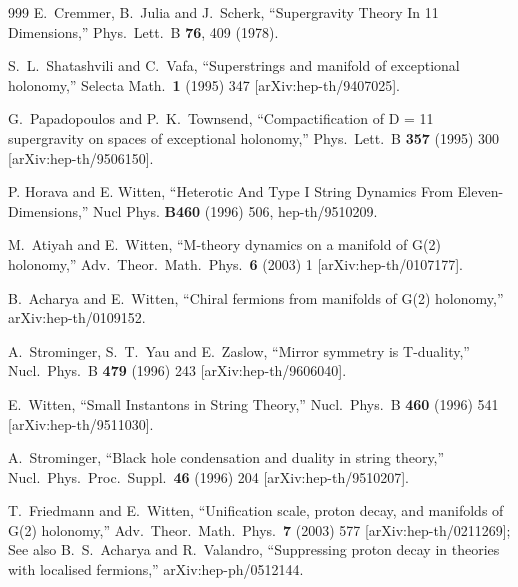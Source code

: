 \begin{thebibliography}{999}
  E.~Cremmer, B.~Julia and J.~Scherk,
  ``Supergravity Theory In 11 Dimensions,''
  Phys.\ Lett.\ B {\bf 76}, 409 (1978).

  S.~L.~Shatashvili and C.~Vafa,
  ``Superstrings and manifold of exceptional holonomy,''
  Selecta Math.\  {\bf 1} (1995) 347
  [arXiv:hep-th/9407025].

  G.~Papadopoulos and P.~K.~Townsend,
  ``Compactification of D = 11 supergravity on spaces of exceptional
  holonomy,''
  Phys.\ Lett.\ B {\bf 357} (1995) 300
  [arXiv:hep-th/9506150].

P. Horava and E. Witten, ``Heterotic And Type I String Dynamics From
Eleven-Dimensions,'' Nucl Phys. {\bf B460} (1996) 506,
hep-th/9510209.

  M.~Atiyah and E.~Witten,
  ``M-theory dynamics on a manifold of G(2) holonomy,''
  Adv.\ Theor.\ Math.\ Phys.\  {\bf 6} (2003) 1
  [arXiv:hep-th/0107177].

  B.~Acharya and E.~Witten,
  ``Chiral fermions from manifolds of G(2) holonomy,''
  arXiv:hep-th/0109152.

  A.~Strominger, S.~T.~Yau and E.~Zaslow,
  ``Mirror symmetry is T-duality,''
  Nucl.\ Phys.\ B {\bf 479} (1996) 243
  [arXiv:hep-th/9606040].

  E.~Witten,
  ``Small Instantons in String Theory,''
  Nucl.\ Phys.\ B {\bf 460} (1996) 541
  [arXiv:hep-th/9511030].

  A.~Strominger,
  ``Black hole condensation and duality in string theory,''
  Nucl.\ Phys.\ Proc.\ Suppl.\  {\bf 46} (1996) 204
  [arXiv:hep-th/9510207].

  T.~Friedmann and E.~Witten,
  ``Unification scale, proton decay, and manifolds of G(2) holonomy,''
  Adv.\ Theor.\ Math.\ Phys.\  {\bf 7} (2003) 577
  [arXiv:hep-th/0211269];
 \\
  See also B.~S.~Acharya and R.~Valandro,
  ``Suppressing proton decay in theories with localised fermions,''
  arXiv:hep-ph/0512144.


\end{thebibliography}
